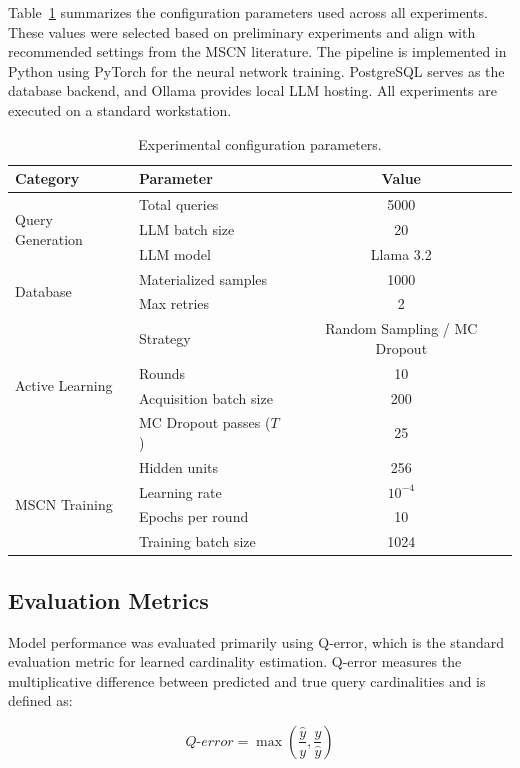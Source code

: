 Table~\ref{tab:exp_config} summarizes the configuration parameters used across all experiments. These values were selected based on preliminary experiments and align with recommended settings from the MSCN literature. The pipeline is implemented in Python using PyTorch for the neural network training. PostgreSQL serves as the database backend, and Ollama\cite{Ollama2024} provides local LLM hosting. All experiments are executed on a standard workstation.

\begin{table}[tb]
\centering
\caption{Experimental configuration parameters.}
\label{tab:exp_config}
\begin{tabular}{|l|l|c|}
\hline
\textbf{Category} & \textbf{Parameter} & \textbf{Value} \\
\hline
\multirow{3}{*}{Query Generation} & Total queries & 5000 \\
 & LLM batch size & 20 \\
 & LLM model & Llama 3.2 \\
\hline
\multirow{2}{*}{Database} & Materialized samples & 1000 \\
 & Max retries & 2 \\
\hline
\multirow{4}{*}{Active Learning} & Strategy & Random Sampling / MC Dropout \\
 & Rounds & 10 \\
 & Acquisition batch size & 200 \\
 & MC Dropout passes ($T$) & 25 \\
\hline
\multirow{4}{*}{MSCN Training} & Hidden units & 256 \\
 & Learning rate & $10^{-4}$ \\
 & Epochs per round & 10 \\
 & Training batch size & 1024 \\
\hline
\end{tabular}
\end{table}

\FloatBarrier
\subsection{Evaluation Metrics}

Model performance was evaluated primarily using Q-error, which is the standard evaluation metric for learned cardinality estimation. Q-error measures the multiplicative difference between predicted and true query cardinalities and is defined as:

\[
Q\text{-}error = \max \left( \frac{\hat{y}}{y}, \frac{y}{\hat{y}} \right)
\]

